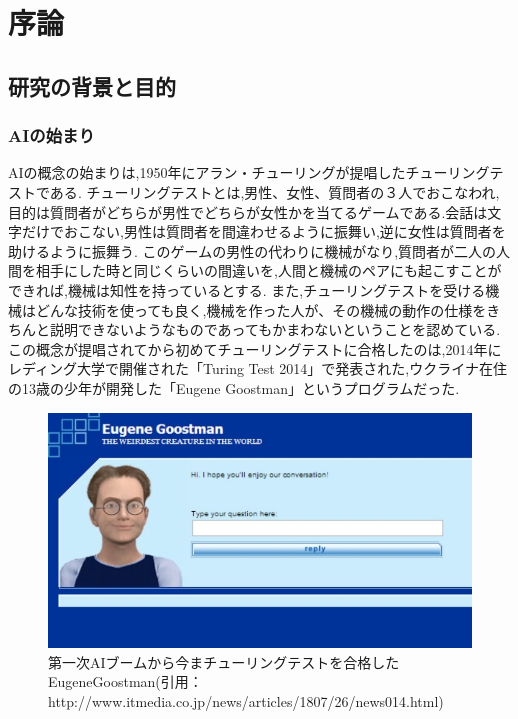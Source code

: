 \chapter{序論}
\section{研究の背景と目的}
\subsection{AIの始まり}
AIの概念の始まりは,1950年にアラン・チューリングが提唱したチューリングテストである\cite{ronbun1}.
チューリングテストとは,男性、女性、質問者の３人でおこなわれ,目的は質問者がどちらが男性でどちらが女性かを当てるゲームである.会話は文字だけでおこない,男性は質問者を間違わせるように振舞い,逆に女性は質問者を助けるように振舞う.
このゲームの男性の代わりに機械がなり,質問者が二人の人間を相手にした時と同じくらいの間違いを,人間と機械のペアにも起こすことができれば,機械は知性を持っているとする.
また,チューリングテストを受ける機械はどんな技術を使っても良く,機械を作った人が、その機械の動作の仕様をきちんと説明できないようなものであってもかまわないということを認めている.
この概念が提唱されてから初めてチューリングテストに合格したのは,2014年にレディング大学で開催された「Turing Test 2014」で発表された,ウクライナ在住の13歳の少年が開発した「Eugene Goostman」というプログラムだった.
\begin{figure}[!ht]
    \begin{screen}
    \begin{center}
        \includegraphics[scale=0.6, clip]{./img/Eugene_Goostman.jpg}
        \caption{第一次AIブームから今まチューリングテストを合格したEugeneGoostman\newline(引用：http://www.itmedia.co.jp/news/articles/1807/26/news014.html)}
        \label{fig:チューリングテストを合格したEugeneGoostman}
    \end{center}
\end{screen}
\end{figure}
